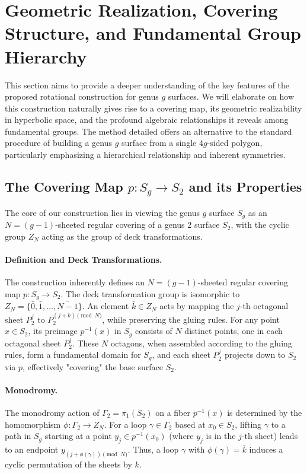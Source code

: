 \documentclass{article}
\theoremstyle{definition}
\theoremstyle{remark}
\begin{document}
\section{Geometric Realization, Covering Structure, and Fundamental Group Hierarchy}
\label{sec:integrated_discussion}

This section aims to provide a deeper understanding of the key features of the proposed rotational construction for genus $g$ surfaces. We will elaborate on how this construction naturally gives rise to a covering map, its geometric realizability in hyperbolic space, and the profound algebraic relationships it reveals among fundamental groups. The method detailed offers an alternative to the standard procedure of building a genus $g$ surface from a single $4g$-sided polygon, particularly emphasizing a hierarchical relationship and inherent symmetries.

\subsection{The Covering Map $p: S_g \to S_2$ and its Properties}

The core of our construction lies in viewing the genus $g$ surface $S_g$ as an $N=(g-1)$-sheeted regular covering of a genus 2 surface $S_2$, with the cyclic group $Z_N$ acting as the group of deck transformations.

\paragraph{Definition and Deck Transformations.}
The construction inherently defines an $N=(g-1)$-sheeted regular covering map $p: S_g \to S_2$. The deck transformation group is isomorphic to $Z_N = \{\bar{0}, \bar{1}, \ldots, \overline{N-1}\}$. An element $\bar{k} \in Z_N$ acts by mapping the $j$-th octagonal sheet $P_2^j$ to $P_2^{(j+k) \pmod N}$, while preserving the gluing rules. For any point $x \in S_2$, its preimage $p^{-1}(x)$ in $S_g$ consists of $N$ distinct points, one in each octagonal sheet $P_2^j$. These $N$ octagons, when assembled according to the gluing rules, form a fundamental domain for $S_g$, and each sheet $P_2^j$ projects down to $S_2$ via $p$, effectively "covering" the base surface $S_2$.

\paragraph{Monodromy.}
The monodromy action of $\Gamma_2 = \pi_1(S_2)$ on a fiber $p^{-1}(x)$ is determined by the homomorphism $\phi: \Gamma_2 \to Z_N$. For a loop $\gamma \in \Gamma_2$ based at $x_0 \in S_2$, lifting $\gamma$ to a path in $S_g$ starting at a point $y_j \in p^{-1}(x_0)$ (where $y_j$ is in the $j$-th sheet) leads to an endpoint $y_{(j+\phi(\gamma)) \pmod N}$. Thus, a loop $\gamma$ with $\phi(\gamma) = \bar{k}$ induces a cyclic permutation of the sheets by $k$.
\end{document}
